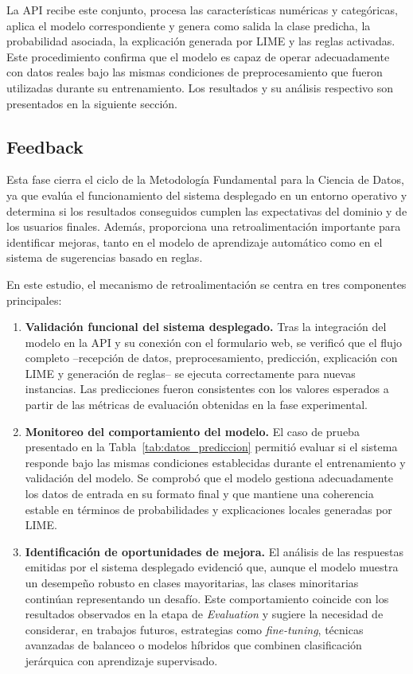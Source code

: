 \documentclass[a4paper,fleqn]{cas-sc}
\begin{document}
	La API recibe este conjunto, procesa las características numéricas y categóricas, aplica el modelo correspondiente y genera como salida la clase predicha, la probabilidad asociada, la explicación generada por LIME y las reglas activadas. Este procedimiento confirma que el modelo es capaz de operar adecuadamente con datos reales bajo las mismas condiciones de preprocesamiento que fueron utilizadas durante su entrenamiento. 
	Los resultados y su análisis respectivo son presentados en la siguiente sección.


\subsection{Feedback}\label{sec:fase10}


	Esta fase cierra el ciclo de la Metodología Fundamental para la Ciencia de Datos, ya que evalúa el funcionamiento del sistema desplegado en un entorno operativo y determina si los resultados conseguidos cumplen las expectativas del dominio y de los usuarios finales. Además,  proporciona una retroalimentación importante para identificar mejoras, tanto en el modelo de aprendizaje automático como en el sistema de sugerencias basado en reglas.



En este estudio, el mecanismo de retroalimentación se centra en tres componentes principales:

\begin{enumerate}
	\item \textbf{Validación funcional del sistema desplegado.}  
	Tras la integración del modelo en la API y su conexión con el formulario web, se verificó que el flujo completo --recepción de datos, preprocesamiento, predicción, explicación con LIME y generación de reglas-- se ejecuta correctamente para nuevas instancias. Las predicciones fueron consistentes con los valores esperados a partir de las métricas de evaluación obtenidas en la fase experimental.
	
	
	\item \textbf{Monitoreo del comportamiento del modelo.}  
	El caso de prueba presentado en la Tabla~\ref{tab:datos_prediccion} permitió evaluar si el sistema responde bajo las mismas condiciones establecidas durante el entrenamiento y validación del modelo. Se comprobó que el modelo gestiona adecuadamente los datos de entrada en su formato final y que mantiene una coherencia estable en términos de probabilidades y explicaciones locales generadas por LIME.
	
	
	\item \textbf{Identificación de oportunidades de mejora.}  
	El análisis de las respuestas emitidas por el sistema desplegado evidenció que, aunque el modelo muestra un desempeño robusto en clases mayoritarias, las clases minoritarias continúan representando un desafío. Este comportamiento coincide con los resultados observados en la etapa de \textit{Evaluation} y sugiere la necesidad de considerar, en trabajos futuros, estrategias como \textit{fine-tuning}, técnicas avanzadas de balanceo o modelos híbridos que combinen clasificación jerárquica con aprendizaje supervisado.
\end{enumerate}
\end{document}
